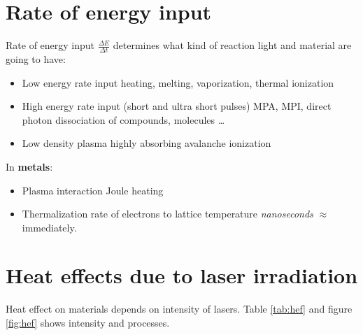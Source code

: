 \section{Rate of energy input}
Rate of energy input $\frac{\Delta E}{\Delta t}$ determines what kind of reaction light and material are going to have:
\begin{itemize}
    \item Low energy rate input \pd heating, melting, vaporization, thermal ionization
    \item High energy rate input (short and ultra short pulses) \pd MPA, MPI, direct photon dissociation of compounds, molecules \dots
    \item Low density plasma \pd highly absorbing \pd avalanche ionization
\end{itemize}

In \textbf{metals}:
\begin{itemize}
    \item Plasma interaction \pd Joule heating
    \item Thermalization rate of electrons to lattice temperature \pd \textit{nanoseconds} $\approx$ immediately.
\end{itemize}

\section{Heat effects due to laser irradiation}
Heat effect on materials depends on intensity of lasers. 
Table \ref{tab:hef} and figure \ref{fig:hef} shows intensity and processes.


